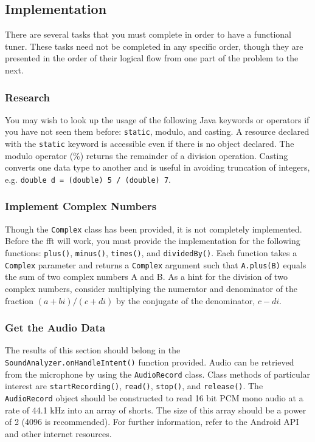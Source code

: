 \subsection{Implementation}
There are several tasks that you must complete in order to have a functional tuner. 
These tasks need not be completed in any specific order, though they are presented in the order of their logical flow from one part of the problem to the next.

\subsubsection{Research}
You may wish to look up the usage of the following Java keywords or operators if you have not seen them before: \verb=static=, modulo, and casting.
A resource declared with the \verb=static= keyword is accessible even if there is no object declared.
The modulo operator (\%) returns the remainder of a division operation.
Casting converts one data type to another and is useful in avoiding truncation of integers, e.g. \verb+double d = (double) 5 / (double) 7+.

\subsubsection{Implement Complex Numbers}
Though the \verb=Complex= class has been provided, it is not completely implemented.
Before the \ac{fft} will work, you must provide the implementation for the following functions: \verb=plus()=, \verb=minus()=, \verb=times()=, and \verb=dividedBy()=.
Each function takes a \verb=Complex= parameter and returns a \verb=Complex= argument such that \verb=A.plus(B)= equals the sum of two complex numbers A and B.
As a hint for the division of two complex numbers, consider multiplying the numerator and denominator of the fraction 
\begin{math}
(a+bi) / (c+di)
\end{math} 
 by the conjugate of the denominator, $c-di$.

\subsubsection{Get the Audio Data}
The results of this section should belong in the \verb=SoundAnalyzer.onHandleIntent()= function provided.
Audio can be retrieved from the microphone by using the \verb=AudioRecord= class.
Class methods of particular interest are \verb=startRecording()=, \verb=read()=, \verb=stop()=, and \verb=release()=.
The \verb=AudioRecord= object should be constructed to read 16 bit PCM mono audio at a rate of 44.1 kHz into an array of shorts.
The size of this array should be a power of 2 (4096 is recommended).
For further information, refer to the Android API and other internet resources.


